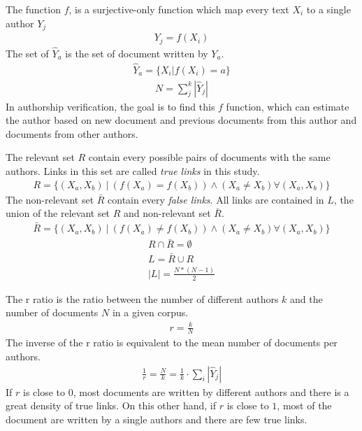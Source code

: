 \begin{definition}
  The function $f$, is a surjective-only function which map every text $X_i$ to a single author $Y_j$
  \begin{gather*}
    Y_j = f(X_i)
  \end{gather*}
  The set of $\hat{Y}_a$ is the set of document written by $Y_a$.
  \begin{gather*}
    \hat{Y}_a = \{X_i | f(X_i) = a\}
  \end{gather*}
  \begin{gather*}
    N = \sum_{j}^k |\hat{Y}_j|
  \end{gather*}
  In authorship verification, the goal is to find this $f$ function, which can estimate the author based on new document and previous documents from this author and documents from other authors.
\end{definition}

\begin{definition}
  The relevant set $R$ contain every possible pairs of documents with the same authors.
  Links in this set are called \textit{true links} in this study.
  \begin{gather*}
    R = \{(X_a, X_b)\ |\ \left( f(X_a) = f(X_b) \right) \land \left(X_a \neq X_b \right) \forall (X_a, X_b)\}
  \end{gather*}
  The non-relevant set $\bar{R}$ contain every \textit{false links}.
  All links are contained in $L$, the union of the relevant set $R$ and non-relevant set $\bar{R}$.
  \begin{gather*}
    \bar{R} = \{(X_a, X_b)\ |\ \left( f(X_a) \neq f(X_b) \right) \land \left(X_a \neq X_b \right) \forall (X_a, X_b)\}
  \end{gather*}
  \begin{gather*}
    R \cap \bar{R} = \emptyset \\
    L = \bar{R} \cup R \\
    |L| = \frac{N * (N-1)}{2}
  \end{gather*}
\end{definition}

\begin{definition}
  The r ratio is the ratio between the number of different authors $k$ and the number of documents $N$ in a given corpus.
  \begin{gather*}
    r = \frac{k}{N}
  \end{gather*}
  The inverse of the r ratio is equivalent to the mean number of documents per authors.
  \begin{gather*}
    \frac{1}{r} = \frac{N}{k} = \frac{1}{k} \cdot \sum_{i} |\hat{Y}_j|
  \end{gather*}
  If $r$ is close to $0$, most documents are written by different authors and there is a great density of true links.
  On this other hand, if $r$ is close to $1$, most of the document are written by a single authors and there are few true links.
\end{definition}

